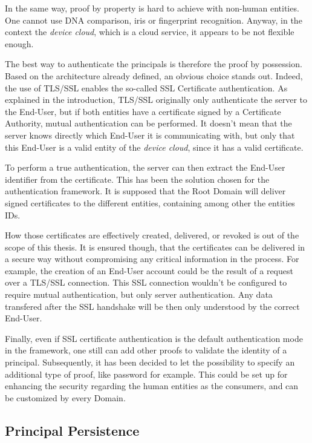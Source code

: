 In the same way, proof by property is hard to achieve with non-human entities. One cannot use DNA comparison, iris or fingerprint recognition. Anyway, in the context the \emph{device cloud}, which is a cloud service, it appears to be not flexible enough.

The best way to authenticate the principals is therefore the proof by possession. Based on the architecture already defined, an obvious choice stands out. Indeed, the use of TLS/SSL enables the so-called SSL Certificate authentication. As explained in the introduction, TLS/SSL originally only authenticate the server to the End-User, but if both entities have a certificate signed by a Certificate Authority, mutual authentication can be performed. It doesn't mean that the server knows directly which End-User it is communicating with, but only that this End-User is a valid entity of the \emph{device cloud}, since it has a valid certificate.

To perform a true authentication, the server can then extract the End-User identifier from the certificate. This has been the solution chosen for the authentication framework. It is supposed that the Root Domain will deliver signed certificates to the different entities, containing among other the entities IDs.

How those certificates are effectively created, delivered, or revoked is out of the scope of this thesis. It is ensured though, that the certificates can be delivered in a secure way without compromising any critical information in the process. For example, the creation of an End-User account could be the result of a request over a TLS/SSL connection. This SSL connection wouldn't be configured to require mutual authentication, but only server authentication. Any data transfered after the SSL handshake will be then only understood by the correct End-User.

Finally, even if SSL certificate authentication is the default authentication mode in the framework, one still can add other proofs to validate the identity of a principal. Subsequently, it has been decided to let the possibility to specify an additional type of proof, like password for example. This could be set up for enhancing the security regarding the human entities as the consumers, and can be customized by every Domain.

\subsection{Principal Persistence}

